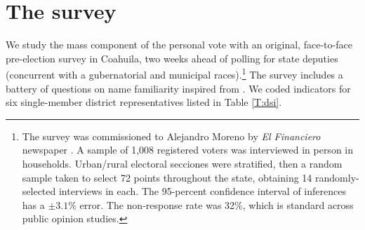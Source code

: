 \documentclass[letter,12pt]{article}
\begin{document}
\section{The survey}

We study the mass component of the personal vote with an original, face-to-face pre-election survey in Coahuila, two weeks ahead of polling for state deputies (concurrent with a gubernatorial and municipal races).\footnote{The survey was commissioned to Alejandro Moreno by \emph{El Financiero} newspaper \citep[interviews were conducted from between May 19--21, 2017, published May 25, ][]{moreno-coah.2017}. A sample of 1,008 registered voters was interviewed in person in households. Urban/rural electoral secciones were stratified, then a random sample taken to select 72 points throughout the state, obtaining 14 randomly-selected interviews  in each. The 95-percent confidence interval of inferences has a $\pm3.1\%$ error. The non-response rate was 32\%, which is standard across public opinion studies.} The survey includes a battery of questions on name familiarity inspired from \citet{cain.etal.1987}. We coded indicators for six single-member district representatives listed in Table \ref{T:dsi}.  

\end{document}
